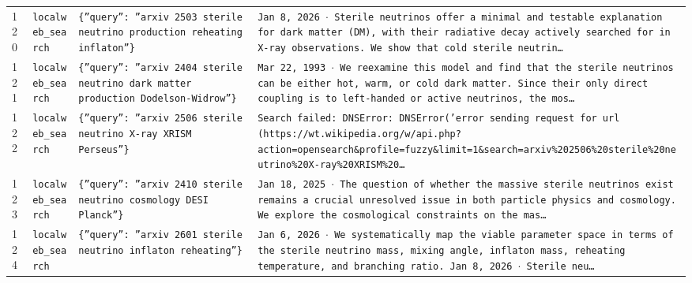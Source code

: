 \documentclass[11pt,a4paper]{article}
\begin{document}
\begin{longtable}{@{}p{}p{}p{}p{}@{}}
120 & \texttt{local}\newline\texttt{web\_\allowbreak{}search} & \texttt{\{''query'':\allowbreak{} ''arxiv 2503 sterile neutrino production reheating inflaton''\}\allowbreak{}} & \texttt{Jan 8,\allowbreak{} 2026 $\cdot$ Sterile neutrinos offer a minimal and testable explanation for dark matter (DM)\allowbreak{},\allowbreak{} with their radiative decay actively searched for in X-ray observations. We show that cold sterile neutrin\ldots{}\allowbreak{}} \\
121 & \texttt{local}\newline\texttt{web\_\allowbreak{}search} & \texttt{\{''query'':\allowbreak{} ''arxiv 2404 sterile neutrino dark matter production Dodelson-Widrow''\}\allowbreak{}} & \texttt{Mar 22,\allowbreak{} 1993 $\cdot$ We reexamine this model and find that the sterile neutrinos can be either hot,\allowbreak{} warm,\allowbreak{} or cold dark matter. Since their only direct coupling is to left-handed or active neutrinos,\allowbreak{} the mos\ldots{}\allowbreak{}} \\
122 & \texttt{local}\newline\texttt{web\_\allowbreak{}search} & \texttt{\{''query'':\allowbreak{} ''arxiv 2506 sterile neutrino X-ray XRISM Perseus''\}\allowbreak{}} & \texttt{Search failed:\allowbreak{} DNSError:\allowbreak{} DNSError('error sending request for url (https:\allowbreak{}/\allowbreak{}/\allowbreak{}wt.wikipedia.org/\allowbreak{}w/\allowbreak{}api.php?action=\allowbreak{}opensearch\&profile=\allowbreak{}fuzzy\&limit=\allowbreak{}1\&search=\allowbreak{}arxiv\%202506\%20sterile\%20neutrino\%20X-ray\%20XRISM\%20\ldots{}\allowbreak{}} \\
123 & \texttt{local}\newline\texttt{web\_\allowbreak{}search} & \texttt{\{''query'':\allowbreak{} ''arxiv 2410 sterile neutrino cosmology DESI Planck''\}\allowbreak{}} & \texttt{Jan 18,\allowbreak{} 2025 $\cdot$ The question of whether the massive sterile neutrinos exist remains a crucial unresolved issue in both particle physics and cosmology. We explore the cosmological constraints on the mas\ldots{}\allowbreak{}} \\
124 & \texttt{local}\newline\texttt{web\_\allowbreak{}search} & \texttt{\{''query'':\allowbreak{} ''arxiv 2601 sterile neutrino inflaton reheating''\}\allowbreak{}} & \texttt{Jan 6,\allowbreak{} 2026 $\cdot$ We systematically map the viable parameter space in terms of the sterile neutrino mass,\allowbreak{} mixing angle,\allowbreak{} inflaton mass,\allowbreak{} reheating temperature,\allowbreak{} and branching ratio. Jan 8,\allowbreak{} 2026 $\cdot$ Sterile neu\ldots{}\allowbreak{}} \\

\end{longtable}
\end{document}
